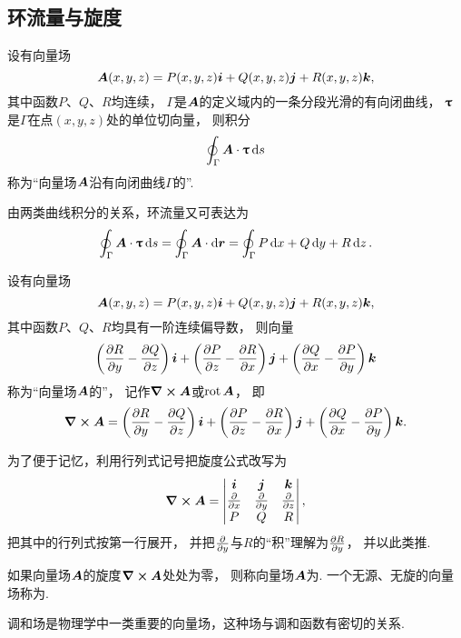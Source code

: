 \subsection{环流量与旋度}
\begin{definition}
设有向量场\[
\boldsymbol{A}(x,y,z)=P(x,y,z)\boldsymbol{i}+Q(x,y,z)\boldsymbol{j}+R(x,y,z)\boldsymbol{k},
\]其中函数\(P\)、\(Q\)、\(R\)均连续，
\(\Gamma\)是\(\boldsymbol{A}\)的定义域内的一条分段光滑的有向闭曲线，
\(\boldsymbol{\uptau}\)是\(\Gamma\)在点\((x,y,z)\)处的单位切向量，
则积分\[
	\oint_\Gamma \boldsymbol{A}\cdot\boldsymbol{\uptau}\dd{s}
\]称为“向量场\(\boldsymbol{A}\)沿有向闭曲线\(\Gamma\)的”.
\end{definition}
由两类曲线积分的关系，环流量又可表达为\[
	\oint_\Gamma \boldsymbol{A}\cdot\boldsymbol{\uptau}\dd{s}
	=\oint_\Gamma \boldsymbol{A}\cdot\dd{\boldsymbol{r}}
	=\oint_\Gamma P\dd{x}+Q\dd{y}+R\dd{z}.
\]

\begin{definition}
设有向量场\[
	\boldsymbol{A}(x,y,z)=P(x,y,z)\boldsymbol{i}+Q(x,y,z)\boldsymbol{j}+R(x,y,z)\boldsymbol{k},
\]
其中函数\(P\)、\(Q\)、\(R\)均具有一阶连续偏导数，
则向量\[
	\left( \pdv{R}{y} - \pdv{Q}{z} \right)\boldsymbol{i}
	+\left( \pdv{P}{z} - \pdv{R}{x} \right)\boldsymbol{j}
	+\left( \pdv{Q}{x} - \pdv{P}{y} \right)\boldsymbol{k}
\]
称为“向量场\(\boldsymbol{A}\)的”，
记作\(\curl{\boldsymbol{A}}\)或\(\operatorname{rot}\boldsymbol{A}\)，
即\[
	\curl{\boldsymbol{A}}
	=\left( \pdv{R}{y} - \pdv{Q}{z} \right)\boldsymbol{i}
	+\left( \pdv{P}{z} - \pdv{R}{x} \right)\boldsymbol{j}
	+\left( \pdv{Q}{x} - \pdv{P}{y} \right)\boldsymbol{k}.
\]
\end{definition}

为了便于记忆，利用行列式记号把旋度公式改写为\[
	\curl{\boldsymbol{A}}
	=\begin{vmatrix}
		\boldsymbol{i} & \boldsymbol{j} & \boldsymbol{k} \\
		\pdv{x} & \pdv{y} & \pdv{z} \\
		P & Q & R \\
	\end{vmatrix},
\]
把其中的行列式按第一行展开，
并把\(\pdv{y}\)与\(R\)的“积”理解为\(\pdv{R}{y}\)，
并以此类推.

\begin{definition}
如果向量场\(\boldsymbol{A}\)的旋度\(\curl{\boldsymbol{A}}\)处处为零，
则称向量场\(\boldsymbol{A}\)为.
一个无源、无旋的向量场称为.
\end{definition}
调和场是物理学中一类重要的向量场，这种场与调和函数有密切的关系.

